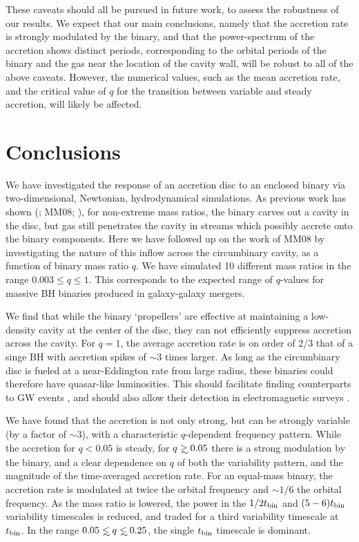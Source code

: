 These caveats should all be pursued in future work, to assess the
robustness of our results.  We expect that our main conclusions,
namely that the accretion rate is strongly modulated by the binary,
and that the power-spectrum of the accretion shows distinct periods,
corresponding to the orbital periods of the binary and the gas near
the location of the cavity wall, will be robust to all of the above
caveats.  However, the numerical values, such as the mean accretion
rate, and the critical value of $q$ for the transition between
variable and steady accretion, will likely be affected.



\section{Conclusions}
\label{Conclusions}

We have investigated the response of an accretion disc to an enclosed
binary via two-dimensional, Newtonian, hydrodynamical simulations. As
previous work has shown (\citealt{AL94, Hayasaki:2007};
MM08; \citealt{Cuadra:2009, ShiKrolik:2012, Roedig:2012:Trqs}), for
non-extreme mass ratios, the binary carves out a cavity in the disc,
but gas still penetrates the cavity in streams which possibly accrete
onto the binary components. Here we have followed up on the work of
MM08 by investigating the nature of this inflow across the
circumbinary cavity, as a function of binary mass ratio $q$.  We have
simulated 10 different mass ratios in the range $0.003 \leq q \leq
1$. This corresponds to the expected range of $q$-values for massive
BH binaries produced in galaxy-galaxy mergers.

We find that while the binary `propellers' are effective at
maintaining a low-density cavity at the center of the disc, they can
not efficiently suppress accretion across the cavity.  
For $q=1$, the average accretion rate is on order of $2/3$ that of a singe BH 
with accretion spikes of $\sim3$ times larger.  As long
as the circumbinary disc is fueled at a near-Eddington rate from large
radius, these binaries could therefore have quasar-like luminosities.
This should facilitate finding counterparts to GW events
\citep{Kocsis+2006}, and should also allow their detection in
electromagnetic surveys \citep{HKM09}. 


We have found that the accretion is not only strong, but can be
strongly variable (by a factor of $\sim3$), with a characteristic $q$-dependent frequency
pattern.  While the accretion for $q<0.05$ is steady, for $q\gsim
0.05$ there is a strong modulation by the binary, and a clear
dependence on $q$ of both the variability pattern, and the magnitude
of the time-averaged accretion rate.  For an equal-mass binary, the
accretion rate is modulated at twice the orbital frequency and $\sim
1/6$ the orbital frequency.  As the mass ratio is lowered, the power
in the $1/2 t_{\rm bin}$ and $(5-6)t_{\rm bin}$ variability timescales is
reduced, and traded for a third variability timescale at $t_{\rm
  bin}$.  In the range $0.05 \lsim q \lsim 0.25$, the single
$t_{\rm bin}$ timescale is dominant.   


